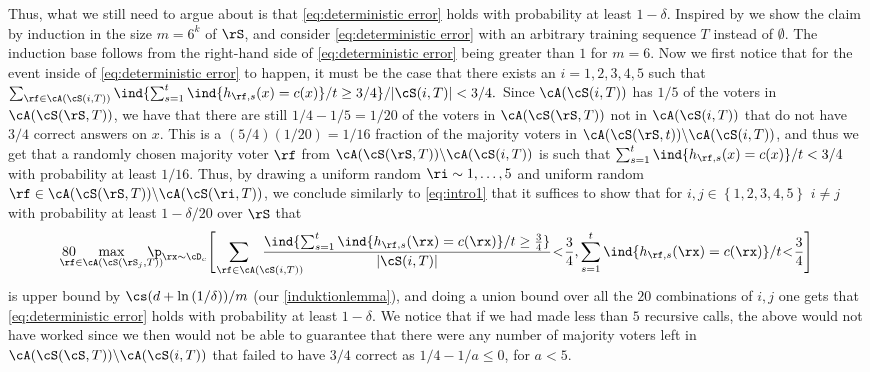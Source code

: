 Thus, what we still need to argue about is that \cref{eq:deterministic error} holds with probability at least $ 1-\delta $. Inspired by \cite{hannekeoptimal} we show the claim by induction in the size $ m=6^{k} $ of $ \rS $, and consider \cref{eq:deterministic error} with an arbitrary training sequence $ T $ instead of $ \emptyset $. The induction base follows from the right-hand side of \cref{eq:deterministic error} being greater than $ 1 $ for $ m=6 $. Now we first notice that for the event inside of \cref{eq:deterministic error} to happen, it must be the case that there exists an $ i =1,2,3,4,5$ such that 
$ \sum_{\rf\in \cA(\cS (i,T))} \ind\{\sum_{s=1}^{t} \ind\{h_{\rf,s}(x)=c(x)\}/t\geq 3/4\}/|\cS(i,T)|
       <3/4.
$
Since $ \cA(\cS(i,T)) $ has $ 1/5  $ of the voters in $ \cA(\cS(\rS,T)) $, we have that there are still $ 1/4-1/5 =1/20$ of the voters in $  \cA(\cS(\rS,T))$ not in $\cA(\cS(i,T))$ that do not have $ 3/4 $ correct answers on $ x $. This is a $ (5/4)(1/20)=1/16 $ fraction of the majority voters in $ \cA(\cS(\rS,t))\backslash \cA(\cS(i,T)) $, and thus we get that a randomly chosen majority voter $ \rf $ from $ \cA(\cS(\rS,T))\backslash \cA(\cS(i,T)) $ is such that  $\sum_{s=1}^{t} \ind\{h_{\rf,s}(x)=c(x)\}/t< 3/4$ with probability at least $ 1/16 $. Thus, by drawing a uniform random $ \ri\sim {1,\ldots,5} $ and uniform random $ \rf \in  \cA(\cS(\rS,T))\backslash \cA(\cS(\ri,T)) $,  we conclude similarly to \cref{eq:intro1} that it suffices to show that for $ i,j\in \left\{ 1,2,3,4,5  \right\}$  $ i\not=j $   with probability at least $ 1-\delta/20 $ over $ \rS $ that 
\begin{align}\label{eq:ourrecursion}
  80 \negmedspace \negmedspace \negmedspace \negmedspace \negmedspace \negmedspace \max_{\rf\in\cA(\cS(\rS_{j},T))} \negmedspace \negmedspace \negmedspace \negmedspace \negmedspace \negmedspace \p_{\rx\sim\cD_{c}}\Bigg[ \negmedspace \negmedspace \negmedspace \negmedspace \negmedspace \negmedspace \negmedspace \negmedspace \negmedspace \negmedspace \negmedspace \negmedspace \negmedspace \negmedspace   \sum_{ \quad\quad \quad \rf\in \cA(\cS (i,T))} \negmedspace \negmedspace \negmedspace \negmedspace \negmedspace \negmedspace \negmedspace \negmedspace \negmedspace \negmedspace \negmedspace \negmedspace \negmedspace \negmedspace \frac{\ind\{\sum_{s=1}^{t} \ind\{h_{\rf,s}(\rx)=c(\rx)\}/t\geq \frac{3}{4}\}}{|\cS(i,T)|}
  \negmedspace  <\negmedspace \frac{3}{4}, \sum_{s=1}^{t} \ind\{h_{\rf,s}(\rx)=c(\rx)\}/t\negmedspace<\negmedspace\frac{3}{4}\Bigg]
\end{align}
is upper bound by $ \cs (d+\ln{\left(1/\delta \right)})/m $ (our \cref{induktionlemma}), and doing a union bound over all the $ 20 $ combinations of $ i,j $ one gets that \cref{eq:deterministic error} holds with probability at least $1- \delta $. We notice that if we had made less than $ 5 $ recursive calls, the above would not have worked since we then would not be able to guarantee that there were any number of majority voters left in $ \cA(\cS(\cS,T))\backslash \cA(\cS(i,T)) $ that failed to have $ 3/4 $ correct as $ 1/4-1/a \leq0$, for $ a<5 $. 

